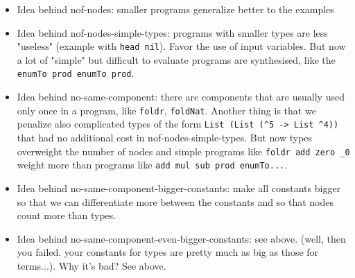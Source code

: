 \begin{itemize}
\item Idea behind nof-nodes: smaller programs generalize better to the examples
\item Idea behind nof-nodes-simple-types: programs with smaller types are less "useless" (example with \lstinline?head nil?). Favor the use of input variables. But now a lot of "simple" but difficult to evaluate programs are synthesised, like the \lstinline?enumTo prod enumTo prod?.
\item Idea behind no-same-component: there are components that are usually used only once in a program, like \lstinline?foldr?, \lstinline?foldNat?. Another thing is that we penalize also complicated types of the form \lstinline?List (List (^5 -> List ^4))? that had no additional cost in nof-nodes-simple-types. But now types overweight the number of nodes and simple programs like \lstinline?foldr add zero _0? weight more than programs like \lstinline?add mul sub prod enumTo...?.
\item Idea behind no-same-component-bigger-constants: make all constants bigger so that we can differentiate more between the constants and so that nodes count more than types.
\item Idea behind no-same-component-even-bigger-constants: see above. (well, then you failed. your constants for types are pretty much as big as those for terms...). Why it's bad? See above.
\end{itemize}

